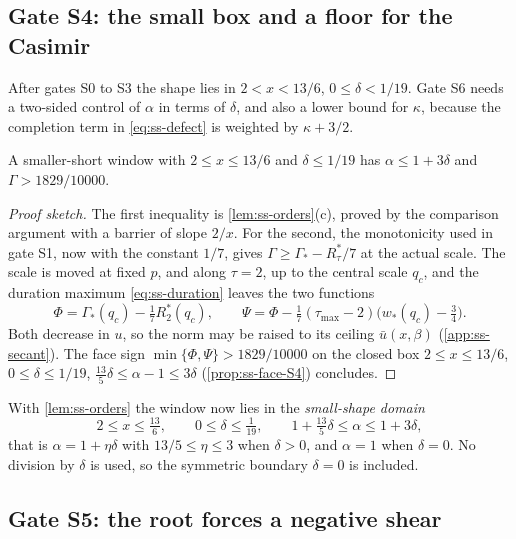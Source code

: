 \subsection{Gate S4: the small box and a floor for the Casimir}\label{sec:ss-S4}

After gates S0 to S3 the shape lies in $2<x<13/6$, $0\le\delta<1/19$. Gate S6 needs a two-sided
control of $\alpha$ in terms of $\delta$, and also a lower bound for $\kappa$, because the
completion term in \eqref{eq:ss-defect} is weighted by $\kappa+3/2$.

\begin{proposition}[Gate S4]\label{prop:ss-S4}
A smaller-short window with $2\le x\le13/6$ and $\delta\le1/19$ has $\alpha\le1+3\delta$ and
$\Gamma>1829/10000$.
\end{proposition}

\begin{proof}[Proof sketch]
The first inequality is \cref{lem:ss-orders}(c), proved by the comparison argument with a barrier
of slope $2/x$. For the second, the monotonicity used in gate S1, now with the constant $1/7$,
gives $\Gamma\ge\Gamma_*-R^*_\tau/7$ at the actual scale. The scale
is moved at fixed $p$, and along $\tau=2$, up to the central scale $q_c$, and the duration maximum
\eqref{eq:ss-duration} leaves the two functions
\[
  \Phi=\Gamma_*(q_c)-\tfrac17R^*_2(q_c),\qquad
  \Psi=\Phi-\tfrac17(\tau_{\max}-2)\bigl(w_*(q_c)-\tfrac34\bigr).
\]
Both decrease in $u$, so the norm may be raised to its ceiling $\bar u(x,\beta)$
(\cref{app:ss-secant}). The face sign $\min\{\Phi,\Psi\}>1829/10000$ on the closed box
$2\le x\le13/6$, $0\le\delta\le1/19$, $\frac{13}{5}\delta\le\alpha-1\le3\delta$
(\cref{prop:ss-face-S4}) concludes.
\end{proof}

With \cref{lem:ss-orders} the window now lies in the \emph{small-shape domain}
\begin{equation}\label{eq:ss-small}
  2\le x\le\tfrac{13}{6},\qquad 0\le\delta\le\tfrac1{19},\qquad
  1+\tfrac{13}{5}\delta\le\alpha\le1+3\delta,
\end{equation}
that is $\alpha=1+\eta\delta$ with $13/5\le\eta\le3$ when $\delta>0$, and $\alpha=1$ when
$\delta=0$. No division by $\delta$ is used, so the symmetric boundary $\delta=0$ is included.

\subsection{Gate S5: the root forces a negative shear}\label{sec:ss-S5}

